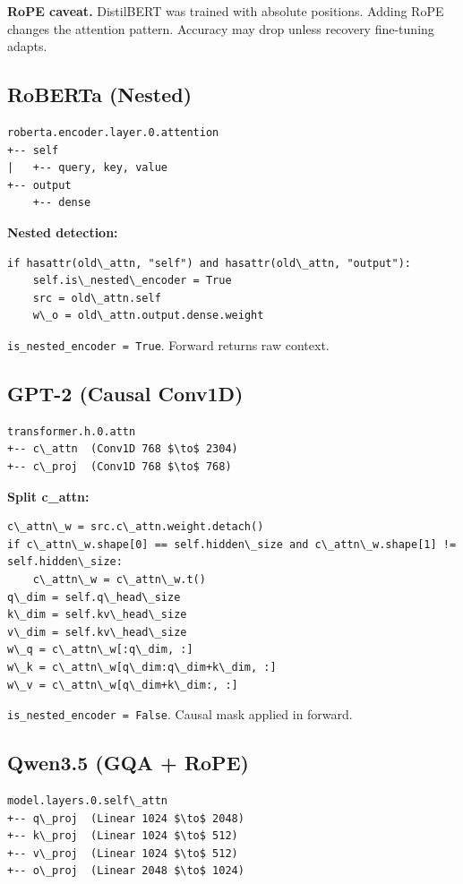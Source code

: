 \textbf{RoPE caveat.} DistilBERT was trained with absolute positions. Adding 
RoPE changes the attention pattern. Accuracy may drop unless recovery 
fine-tuning adapts.

\subsection{RoBERTa (Nested)}

\begin{lstlisting}
roberta.encoder.layer.0.attention
+-- self
|   +-- query, key, value
+-- output
    +-- dense
\end{lstlisting}

\textbf{Nested detection:}
\begin{lstlisting}
if hasattr(old\_attn, "self") and hasattr(old\_attn, "output"):
    self.is\_nested\_encoder = True
    src = old\_attn.self
    w\_o = old\_attn.output.dense.weight
\end{lstlisting}

\texttt{is\_nested\_encoder = True}. Forward returns raw context.

\subsection{GPT-2 (Causal Conv1D)}

\begin{lstlisting}
transformer.h.0.attn
+-- c\_attn  (Conv1D 768 $\to$ 2304)
+-- c\_proj  (Conv1D 768 $\to$ 768)
\end{lstlisting}

\textbf{Split c\_attn:}
\begin{lstlisting}
c\_attn\_w = src.c\_attn.weight.detach()
if c\_attn\_w.shape[0] == self.hidden\_size and c\_attn\_w.shape[1] != self.hidden\_size:
    c\_attn\_w = c\_attn\_w.t()
q\_dim = self.q\_head\_size
k\_dim = self.kv\_head\_size
v\_dim = self.kv\_head\_size
w\_q = c\_attn\_w[:q\_dim, :]
w\_k = c\_attn\_w[q\_dim:q\_dim+k\_dim, :]
w\_v = c\_attn\_w[q\_dim+k\_dim:, :]
\end{lstlisting}

\texttt{is\_nested\_encoder = False}. Causal mask applied in forward.

\subsection{Qwen3.5 (GQA + RoPE)}

\begin{lstlisting}
model.layers.0.self\_attn
+-- q\_proj  (Linear 1024 $\to$ 2048)
+-- k\_proj  (Linear 1024 $\to$ 512)
+-- v\_proj  (Linear 1024 $\to$ 512)
+-- o\_proj  (Linear 2048 $\to$ 1024)
\end{lstlisting}

